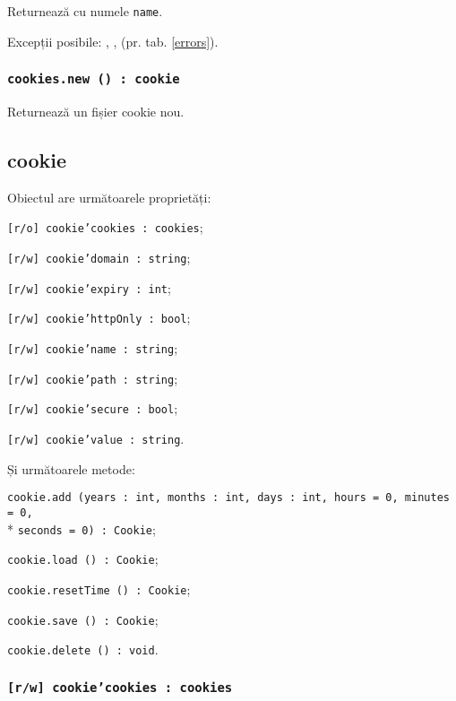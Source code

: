 Returnează \cookie{} cu numele \texttt{name}.

Excepții posibile: , ,  (pr. tab. \ref{errors}).

\subsubsection{\texttt{cookies.new () : cookie}}

Returnează un fișier cookie nou.

\subsection{{\color{orange} cookie}}

Obiectul \cookie{} are următoarele proprietăți:
\begin{icItems}
	\item \texttt{[r/o] cookie'cookies : cookies};
	\item \texttt{[r/w] cookie'domain : string};
	\item \texttt{[r/w] cookie'expiry : int};
	\item \texttt{[r/w] cookie'httpOnly : bool};
	\item \texttt{[r/w] cookie'name : string};
	\item \texttt{[r/w] cookie'path : string};
	\item \texttt{[r/w] cookie'secure : bool};
	\item \texttt{[r/w] cookie'value : string}.
\end{icItems}

Și următoarele metode:
\begin{icItems}
	\item \texttt{cookie.add (years : int, months : int, days : int, hours = 0, minutes = 0,}\\* \texttt{seconds = 0) : Cookie};
	\item \texttt{cookie.load () : Cookie};
	\item \texttt{cookie.resetTime () : Cookie};
	\item \texttt{cookie.save () : Cookie};
	\item \texttt{cookie.delete () : void}.
\end{icItems}

\subsubsection{\texttt{[r/w] cookie'cookies : cookies}}

